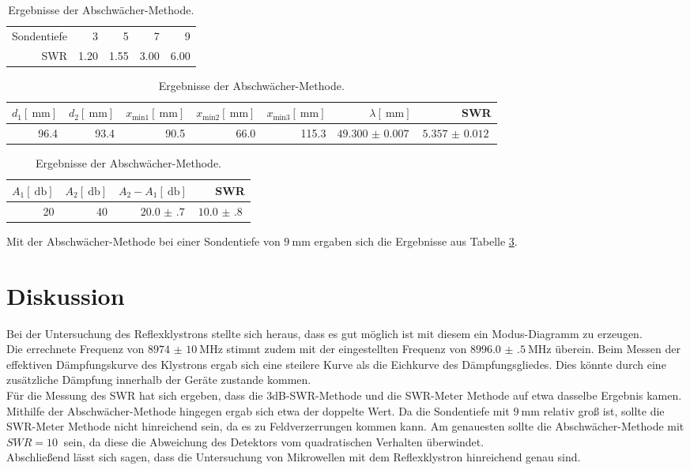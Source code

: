 \begin{table}
	\centering
	\caption{Ergebnisse der SWR-Meter Methode.}
	\begin{tabular}{r || r r r r|}
	 Sondentiefe &    3 &    5 &    7 &    9\\
	        SWR & 1.20 & 1.55 & 3.00 & 6.00\\
	\end{tabular}
\caption{Ergebnisse der 3dB-SWR-Methode.}
	\label{v3:1}
	\begin{tabular}{r r r r r r r}
	$d_\text{1}[\SI{}{\milli\meter}]$ & $d_\text{2}[\SI{}{\milli\meter}]$ & $x_\text{min1}[\SI{}{\milli\meter}]$ & $x_\text{min2}[\SI{}{\milli\meter}]$ & $x_\text{min3}[\SI{}{\milli\meter}]$ & $\lambda[\SI{}{\milli\meter}]$ & SWR\\
	\hline
	\hline
	96.4 & 93.4 & 90.5 & 66.0 & 115.3 & $\SI{49.300(7)}{}$ & $\SI{5.357(12)}{}$\\
	\end{tabular}
	\caption{Ergebnisse der Abschwächer-Methode.}
	\label{v3:2}
	\begin{tabular}{r r r r}
	$A_\text{1}[\SI{}{\decibel}]$ & $A_\text{2}[\SI{}{\decibel}]$ & $A_\text{2}-A_\text{1}[\SI{}{\decibel}]$ & SWR\\
	\hline
	\hline
	20 & 40 & $\SI{20.0(7)}{}$ & $\SI{10.0(8)}{}$\\
	\end{tabular}
	\label{v3:3}
\end{table}

Mit der Abschwächer-Methode bei einer Sondentiefe von $\SI{9}{\milli\meter}$ ergaben sich die Ergebnisse aus Tabelle \ref{v3:3}.\\


\section{Diskussion} %
\label{sec:diskussion}

Bei der Untersuchung des Reflexklystrons stellte sich heraus, dass es gut möglich ist mit diesem ein Modus-Diagramm zu erzeugen.\\

Die errechnete Frequenz von $\SI{8974(10)}{\mega\hertz}$ stimmt zudem mit der eingestellten Frequenz von $\SI{8996.0(5)}{\mega\hertz}$ überein.
Beim Messen der effektiven Dämpfungskurve des Klystrons ergab sich eine steilere Kurve als die Eichkurve des Dämpfungsgliedes.
Dies könnte durch eine zusätzliche Dämpfung innerhalb der Geräte zustande kommen.\\

Für die Messung des SWR hat sich ergeben, dass die 3dB-SWR-Methode und die SWR-Meter Methode auf etwa dasselbe Ergebnis kamen.
Mithilfe der Abschwächer-Methode hingegen ergab sich etwa der doppelte Wert.
Da die Sondentiefe mit $\SI{9}{\milli\meter}$ relativ groß ist, sollte die SWR-Meter Methode nicht hinreichend sein, da es zu Feldverzerrungen kommen kann.
Am genauesten sollte die Abschwächer-Methode mit $SWR = \SI{10}{}$ sein, da diese die Abweichung des Detektors vom quadratischen Verhalten überwindet.\\

Abschließend lässt sich sagen, dass die Untersuchung von Mikrowellen mit dem Reflexklystron hinreichend genau sind.
